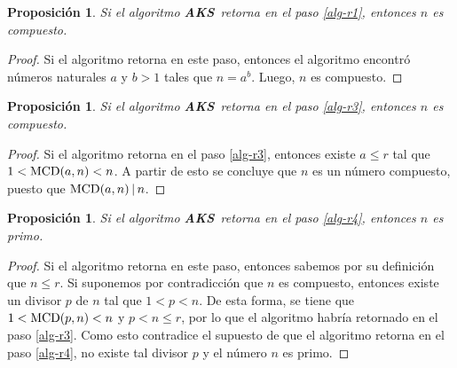 \documentclass[10pt]{article}
\newcommand{\0}{\mathbf{0}}
\newcommand{\1}{\mathbf{1}}
\newcommand{\divi}{\hspace{1.8pt}|\hspace{1.8pt}}
\newcommand{\MCD}{{\rm MCD}}
\newcommand{\+}{\oplus}
\newtheorem{proposition}[theorem]{Proposición}
\theoremstyle{remark}
\theoremstyle{remark}
\newcommand{\AKS}{{\rm \textbf{AKS}}}
\begin{document}
	\begin{proposition}
		Si el algoritmo \AKS\ retorna en el paso \ref{alg-r1}, entonces $n$ es compuesto. 
	\end{proposition}
	\begin{proof}
	Si el algoritmo retorna en este paso, entonces el algoritmo encontró números naturales $a$ y $b>1$ tales que $n=a^b$. Luego, $n$ es compuesto.
	\end{proof}
	
	\begin{proposition}
		Si el algoritmo \AKS\ retorna en el paso \ref{alg-r3}, entonces $n$ es compuesto. 
	\end{proposition}
	\begin{proof}
	Si el algoritmo retorna en el paso \ref{alg-r3}, entonces existe $a \leq r$ tal que $1<\MCD(a,n)<n$. A partir de esto se concluye que $n$ es un número compuesto, puesto que $\MCD(a,n) \divi n$. 
	\end{proof}
	\begin{proposition}
	Si el algoritmo \AKS\ retorna en el paso \ref{alg-r4}, entonces $n$ es primo. 
	\end{proposition}
	\begin{proof}
	  Si el algoritmo retorna en este paso, entonces sabemos por su definición
          que $n\leq r$. Si suponemos por contradicción que $n$ es compuesto, entonces existe un divisor $p$ de $n$ tal que $1 < p < n$. De esta forma, se tiene que $1 < \MCD(p,n) < n$ y $p < n \leq r$, por lo que el algoritmo habría retornado en el paso \ref{alg-r3}.
	Como esto contradice el supuesto de que el algoritmo retorna en el paso \ref{alg-r4}, no existe tal divisor $p$ y el número $n$ es primo. 
	\end{proof}
\end{document}
